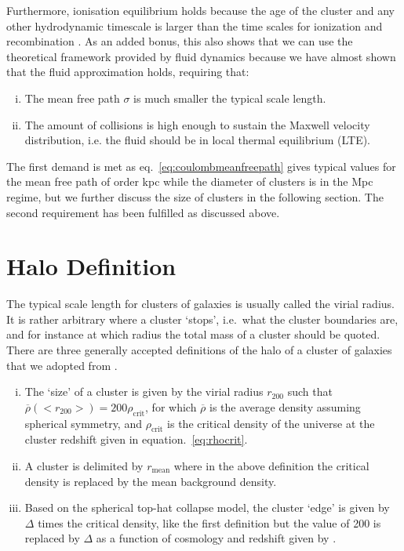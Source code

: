\documentclass[MScProj_TLRH_ClusterEnergy.tex]{subfiles}
\begin{document}
Furthermore, ionisation equilibrium holds because the age of the cluster and any 
other hydrodynamic timescale is larger than the time scales for ionization and 
recombination \citep{1988xrec.book.....S}. As an added bonus, this also shows
that we can use the theoretical framework provided by fluid dynamics because 
we have almost shown that the fluid approximation holds, requiring that:

\begin{enumerate}[i)]
    \item The mean free path $\sigma$ is much smaller the typical scale length.
    \item The amount of collisions is high enough to sustain the Maxwell velocity
        distribution, i.e. the fluid should be in local thermal equilibrium (LTE).
\end{enumerate}

The first demand is met as eq.~\eqref{eq:coulombmeanfreepath} gives typical
values for the mean free path of order kpc while the diameter of clusters is
in the Mpc regime, but we further discuss the size of clusters in the following 
section. The second requirement has been fulfilled as discussed above. 






\section*{Halo Definition}

The typical scale length for clusters of galaxies is usually called the virial 
radius. It is rather arbitrary where a cluster `stops', i.e.\ what the
cluster boundaries are, and for instance at which radius the total mass of a
cluster should be quoted. There are three generally accepted definitions of the
halo of a cluster of galaxies that we adopted from \citet{2008MNRAS.390L..64D}.
\begin{enumerate}[i)]
    \item The `size' of a cluster is given by the virial radius $r_{200}$ such
        that $\overline{\rho}(<r_{200}>) = 200 \rho_{\text{crit}}$, for which
        $\overline{\rho}$ is the average density assuming spherical symmetry, and
        $\rho_{\text{crit}}$ is the critical density of the universe
        at the cluster redshift given in equation.~\eqref{eq:rhocrit}.
    \item A cluster is delimited by $r_{\text{mean}}$ where in the above definition
        the critical density is replaced by the mean background density.
    \item Based on the spherical top-hat collapse model, the cluster `edge' is given
        by $\Delta$ times the critical density, like the first definition but the
        value of 200 is replaced by $\Delta$ as a function of cosmology and redshift
        given by \citet{1998ApJ...495...80B}.
\end{enumerate}
\end{document}
